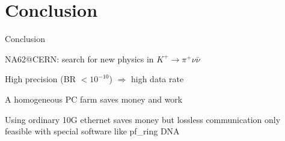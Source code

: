 \section{Conclusion}
\begin{frame}{Conclusion}{}
	\begin{itemize}
		\mickey NA62@CERN: search for new physics in $K^+ \rightarrow \pi^+ \nu
		\bar{\nu}$
		
		\vspace{2mm}
		\mickey High precision (BR $< 10^{-10}$) $\Rightarrow$ high data rate
		
		\vspace{2mm}
		\mickey A homogeneous PC farm saves money and work
		
		\vspace{2mm}
		\mickey Using ordinary 10G ethernet saves money but lossless communication only
feasible with special software like pf\_ring DNA
		
	\end{itemize}
\end{frame}

